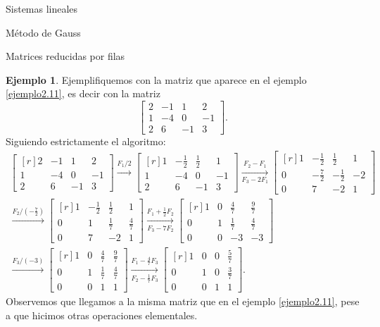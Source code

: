 \documentclass[a4paper,12pt,twoside,spanish,reqno]{amsbook}
\theoremstyle{definition}
\newtheorem{ejemplo}{Ejemplo}[section]
\theoremstyle{remark}
\begin{document}
\begin{chapter}{Sistemas lineales}
\begin{section}{Método de Gauss }
\begin{subsection}{Matrices reducidas por filas}
				
				\begin{ejemplo} Ejemplifiquemos con la matriz que aparece en el ejemplo  \ref{ejemplo2.11},  es decir con la matriz
					$$
					\begin{bmatrix} 2& -1&1& 2 \\ 1&-4 &0&-1 \\ 2&6&-1&3 \end{bmatrix}.
					$$
					Siguiendo estrictamente el algoritmo:
					\begin{multline*}
					\begin{bmatrix*}[r] 2& -1&1& 2 \\ 1&-4 &0&-1 \\ 2&6&-1&3 \end{bmatrix*}
					\stackrel{F_1/2}{\longrightarrow} 
					\begin{bmatrix*}[r] 1& -\frac12&\frac12& 1 \\ 1&-4 &0&-1 \\ 2&6&-1&3 \end{bmatrix*}
					\underset{F_3-2F_1}{\stackrel{F_2- F_1}{\longrightarrow}} 
					\begin{bmatrix*}[r] 1& -\frac12&\frac12& 1 \\ 0&-\frac72 &-\frac12&-2 \\ 0&7&-2&1 \end{bmatrix*}
					\\
					\stackrel{F_2/(-\frac72)}{\longrightarrow} 
					\begin{bmatrix*}[r] 1& -\frac12&\frac12& 1 \\ 0&1 &\frac17&\frac47 \\ 0&7&-2&1 \end{bmatrix*}
					\underset{F_3-7F_2}{\stackrel{F_1 +\frac12 F_2}{\longrightarrow}} 
					\begin{bmatrix*}[r] 1& 0&\frac47& \frac97 \\ 0&1 &\frac17&\frac47 \\ 0&0&-3&-3 \end{bmatrix*}
					\\
					\stackrel{F_3/(-3)}{\longrightarrow} 
					\begin{bmatrix*}[r] 1& 0&\frac47& \frac97 \\ 0&1 &\frac17&\frac47 \\ 0&0&1&1 \end{bmatrix*}
					\underset{F_2-\frac17F_3}{\stackrel{F_1 -\frac47 F_3}{\longrightarrow}} 
					\begin{bmatrix*}[r] 1& 0&0& \frac{5}7 \\ 0&1 &0&\frac37 \\ 0&0&1&1 \end{bmatrix*}.
					\end{multline*}
					Observemos que llegamos a la misma matriz que en el ejemplo \ref{ejemplo2.11}, pese a que hicimos otras operaciones elementales.
				\end{ejemplo}
				


\end{subsection}
\end{section}
\end{chapter}
\end{document}
